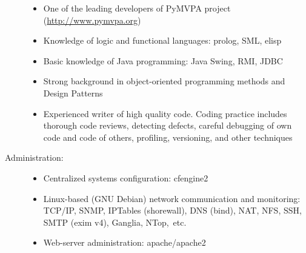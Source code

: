 \documentclass[12pt,overlapped,line]{res}
\newcommand{\wdescription}[1]{({\small \textit{#1}})}
\begin{document}
\begin{resume}
\begin{description}
\begin{itemize}
      \item One of the leading developers of PyMVPA project
        (\url{http://www.pymvpa.org})

      \item Knowledge of logic and functional languages: prolog, SML,
        elisp

      \item Basic knowledge of Java programming: Java Swing, RMI, JDBC

%
%

      \item Strong background in object-oriented programming methods
        and Design Patterns

      \item Experienced writer of high quality code. Coding practice
        includes thorough code reviews, detecting defects, careful
        debugging of own code and code of others, profiling,
        versioning, and other techniques
      \end{itemize}
    \pagebreak
    \item[Administration:] \hspace*{\fill}
      \begin{itemize}

      \item Centralized systems configuration: cfengine2

      \item Linux-based (GNU Debian) network communication and
        monitoring: TCP/IP, SNMP, IPTables (shorewall), DNS (bind), NAT,
        NFS, SSH, SMTP (exim v4), Ganglia, NTop,\ etc.

      \item Web-server administration: apache/apache2



\end{itemize}
\end{description}
\end{resume}
\end{document}
